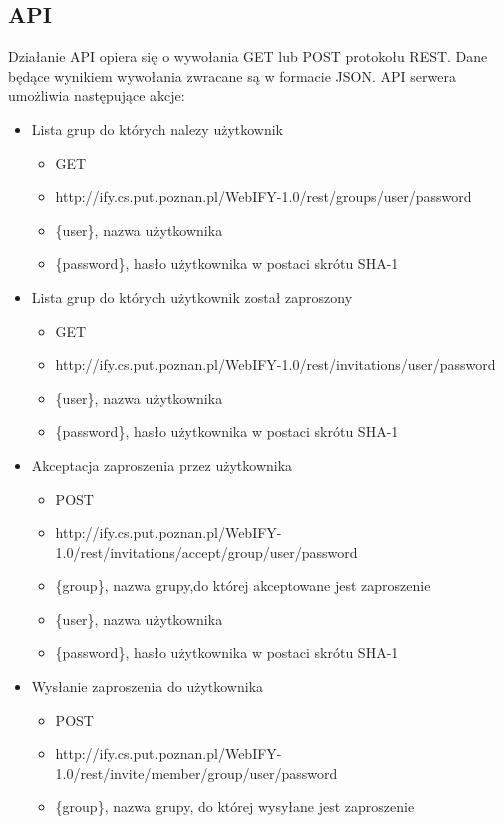 \documentclass[11pt,a4paper,polish,thesis]{dcsbook}
\begin{document}
\subsection{API} %
Działanie API opiera się o wywołania GET lub POST protokołu REST. Dane będące wynikiem wywołania zwracane są w formacie JSON.
API serwera umożliwia następujące akcje:
\begin{itemize}
\item Lista grup do których nalezy użytkownik
\begin{itemize}
\item GET
\item http://ify.cs.put.poznan.pl/WebIFY-1.0/rest/groups/{user}/{password} 
\item \{user\}, nazwa użytkownika
\item \{password\}, hasło użytkownika w postaci skrótu SHA-1
\end{itemize}
\item Lista grup do których użytkownik został zaproszony
\begin{itemize}
\item GET
\item http://ify.cs.put.poznan.pl/WebIFY-1.0/rest/invitations/{user}/{password}
\item \{user\}, nazwa użytkownika
\item \{password\}, hasło użytkownika w postaci skrótu SHA-1
\end{itemize}
\item Akceptacja zaproszenia przez użytkownika
\begin{itemize}
\item POST
\item http://ify.cs.put.poznan.pl/WebIFY-1.0/rest/invitations/accept/{group}/{user}/{password}
\item \{group\}, nazwa grupy,do której akceptowane jest zaproszenie 
\item \{user\}, nazwa użytkownika
\item \{password\},  hasło użytkownika w postaci skrótu SHA-1
\end{itemize}
\item Wysłanie zaproszenia do użytkownika
\begin{itemize}
\item POST
\item http://ify.cs.put.poznan.pl/WebIFY-1.0/rest/invite/{member}/{group}/{user}/{password}
\item \{group\}, nazwa grupy, do której wysyłane jest zaproszenie

\end{itemize}
\end{itemize}
\end{document}
